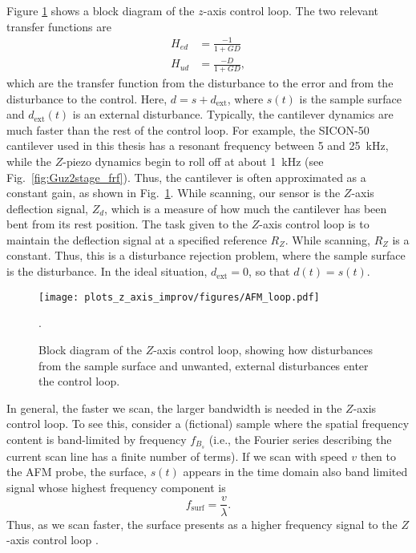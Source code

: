 Figure \ref{fig:zimprv:z_axis_bd} shows a block diagram of the $z$-axis control loop.
The two relevant transfer functions are
\begin{align}
  H_{ed} &= \frac{-1}{1 + GD}\\
  H_{ud} &= \frac{-D}{1 + GD}, \label{eqn:hud}
\end{align}
which are the transfer function from the disturbance to the error and from the disturbance to the control. Here, $d=s+d_{\text{ext}}$, where $s(t)$ is the sample surface and $d_{\text{ext}}(t)$ is an external disturbance. Typically, the cantilever dynamics are much faster than the rest of the control loop. For example, the SICON-50 cantilever used in this thesis has a resonant frequency between 5 and 25~kHz, while the $Z$-piezo dynamics begin to roll off at about 1~kHz (see Fig.~\ref{fig:Guz2stage_frf}). Thus, the cantilever is often approximated as a constant gain, as shown in Fig.~\ref{fig:zimprv:z_axis_bd}. While scanning, our sensor is the $Z$-axis deflection signal, $Z_{d}$, which is a measure of how much the cantilever has been bent from its rest position. The task given to the $Z$-axis control loop is to maintain the deflection signal at a specified reference $R_Z$. While scanning, $R_Z$ is a constant. Thus, this is a disturbance rejection problem, where the sample surface is the disturbance. In the ideal situation, $d_{\text{ext}}=0$, so that $d(t) = s(t)$.
\begin{figure}[t!]
  \centering
  \texttt{[image: plots\_z\_axis\_improv/figures/AFM\_loop.pdf]}
  \caption{Block diagram of the $Z$-axis control loop, showing how disturbances from the sample surface and unwanted, external disturbances enter the control loop.}.
  \label{fig:zimprv:z_axis_bd}
\end{figure}

In general, the faster we scan, the larger bandwidth is needed in the $Z$-axis control loop. To see this, 
consider a (fictional) sample where the spatial frequency content is band-limited by frequency $f_{B_s}$ (i.e., the Fourier series describing the current scan line has a finite number of terms).
If we scan with speed $v$ then to the AFM probe, the surface, $s(t)$ appears in the time domain also band limited signal whose highest frequency component is
\begin{equation}
  f_{\textrm{surf}} = \frac{v}{\lambda}.
\end{equation}
Thus, as we scan faster, the surface presents as a higher frequency signal to the $Z$-axis control loop \cite{ando_highspeed_2008}.

